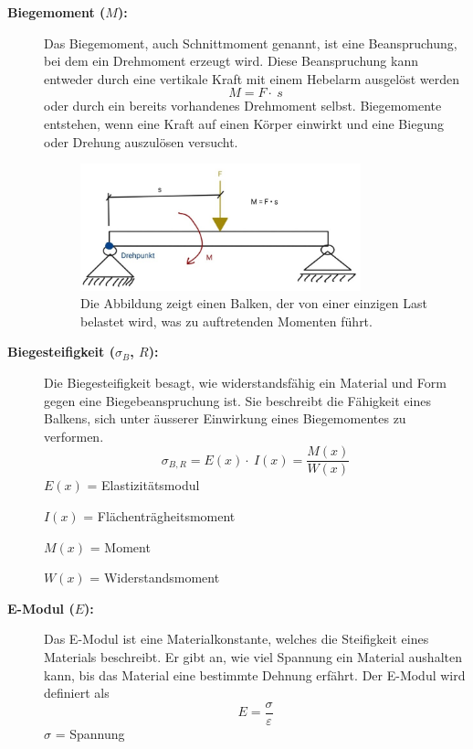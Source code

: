 \begin{description}
\item[\textbf{Biegemoment ($M$):}] Das Biegemoment, auch Schnittmoment genannt, ist eine Beanspruchung, bei dem ein Drehmoment erzeugt wird.
Diese Beanspruchung kann entweder durch eine vertikale Kraft mit einem Hebelarm ausgelöst werden
\begin{equation}
	M=
	F\cdot\ s
\end{equation}
oder durch ein bereits vorhandenes Drehmoment selbst.
Biegemomente entstehen, wenn eine Kraft auf einen Körper einwirkt und eine Biegung oder Drehung auszulösen versucht.
\begin{figure}
	\centering
	\includegraphics[width=0.8\textwidth]{papers/balken/images/teil1/Biegemoment.jpg}
	\caption{Die Abbildung zeigt einen Balken, der von einer einzigen Last belastet wird, was zu auftretenden Momenten führt.}
	\label{fig:Die Abbildung zeigt einen Balken, der von einer einzigen Last belastet wird, was zu auftretenden Momenten führt.}
\end{figure}

\item[\textbf{Biegesteifigkeit ($σ_B$, $R$):}] Die Biegesteifigkeit besagt, wie widerstandsfähig ein Material und Form gegen eine Biegebeanspruchung ist.
Sie beschreibt die Fähigkeit eines Balkens, sich unter äusserer Einwirkung eines Biegemomentes zu verformen.
\begin{equation}
\sigma_{B,R}=E
\left(x\right)\cdot\ I\left(x\right)=
\frac{M(x)}{W(x)}
\end{equation}
$E(x)$ = Elastizitätsmodul

$I(x)$ = Flächenträgheitsmoment

$M(x)$ = Moment 

$W(x)$ = Widerstandsmoment

\item[\textbf{E-Modul ($E$):}] Das E-Modul ist eine Materialkonstante, welches die Steifigkeit eines Materials beschreibt.
Er gibt an, wie viel Spannung ein Material aushalten kann, bis das Material eine bestimmte Dehnung erfährt. \cite{balken:Elastizitaetsmodul}
Der E-Modul wird definiert als
\begin{equation}
E=
\frac{\sigma}{\varepsilon}
\end{equation}
$σ$ = Spannung


\end{description}
